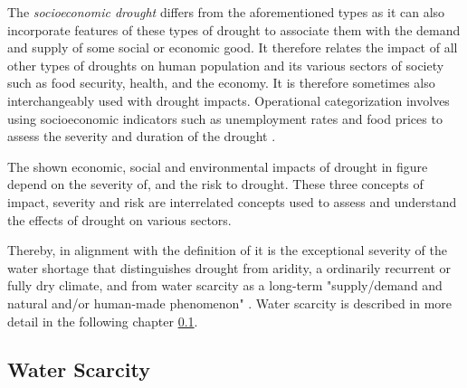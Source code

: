 {The \textit{socioeconomic drought} differs from the aforementioned types as it can also incorporate features of these types of drought to associate them with the demand and supply of some social or economic good. It therefore relates the impact of all other types of droughts on human population and its various sectors of society such as food security, health, and the economy. It is therefore sometimes also interchangeably used with drought impacts. Operational categorization involves using socioeconomic indicators such as unemployment rates and food prices to assess the severity and duration of the drought \autocite{nationaldroughtmitigationcenterTypesDrought,wilhiteUnderstandingDroughtPhenomenon1985}.


The shown economic, social and environmental impacts of drought in figure  depend on the severity of, and the risk to drought. These three concepts of impact, severity and risk are interrelated concepts used to assess and understand the effects of drought on various sectors. 



Thereby, in alignment with the definition of \autocite{vanloonDroughtHumanmodifiedWorld2016} it is the exceptional severity of the water shortage that distinguishes drought from aridity, a ordinarily recurrent or fully dry climate, and from water scarcity as a long-term "supply/demand and natural and/or human-made phenomenon" \autocites[7]{idmpDroughtWaterScarcity2022}{vereintenationenSpecialReportDrought2021, vanClimatologicalRiskDroughts2017}. Water scarcity is described in more detail in the following chapter \ref*{subsec:water_scarcity}.



\subsection{Water Scarcity}\label{subsec:water_scarcity}

}
